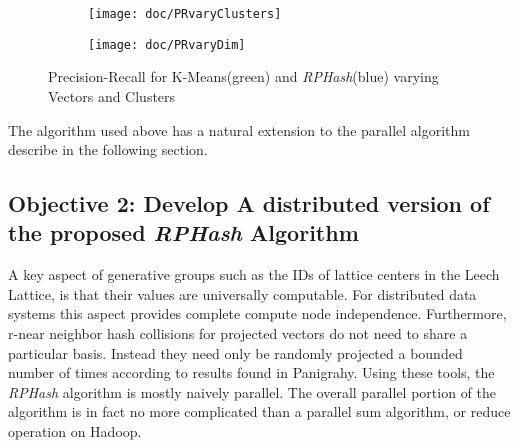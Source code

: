 \documentclass[a4paper,10pt]{article}
\begin{document}
\begin{figure}
        \centering
        \begin{subfigure}[b]{0.49\textwidth}
                \texttt{[image: doc/PRvaryClusters]}
                \label{PRaccClu}
        \end{subfigure}
        \begin{subfigure}[b]{0.49\textwidth}
                \texttt{[image: doc/PRvaryDim]}
                \label{PRaccDim}
        \end{subfigure}
	 \caption{Precision-Recall for K-Means(green) and \emph{RPHash}(blue) 
              varying Vectors and Clusters}\label{praccuracy}
\end{figure}


The algorithm used above has a natural extension to the parallel algorithm
describe in the following section.

\subsection{Objective 2:  Develop A distributed version of the proposed
\emph{RPHash} Algorithm} A key aspect of generative groups such as the
IDs of lattice centers in the Leech Lattice, is that their values are
universally computable.  For distributed data systems this aspect provides
complete compute node independence.  Furthermore, r-near neighbor hash
collisions for projected vectors do not need to share a particular basis.
Instead they need only be randomly projected a bounded number of times
according to results found in Panigrahy\cite{panigrahy}.  Using these tools,
the \emph{RPHash} algorithm is mostly naively parallel.  The overall parallel
portion of the algorithm is in fact no more complicated than a parallel sum
algorithm, or reduce operation on Hadoop.  
\end{document}
